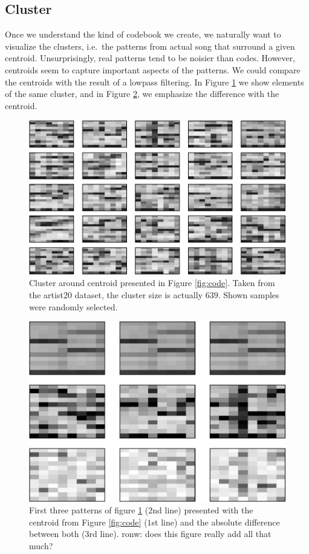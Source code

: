 \documentclass{article}
\newcommand{\ie}{i.e.~}
\begin{document}
\subsection{Cluster}
Once we understand the kind of codebook we create, we naturally want
to visualize the clusters, \ie the patterns from actual song that
surround a given centroid. Unsurprisingly, real patterns tend to be
noisier than codes. However, centroids seem to capture important aspects
of the patterns. We could compare the centroids with the result of
a lowpass filtering. In Figure \ref{fig:cluster} we show elements of the same
cluster, and in Figure \ref{fig:cluster_diff}, we emphasize the difference
with the centroid.

\begin{figure}[htb]
\begin{center}
\includegraphics[width=.9\columnwidth]{close_patterns1}
\end{center}
\caption{\small{Cluster around centroid presented in
Figure \ref{fig:code}. Taken from the artist20 dataset, the cluster
size is actually $639$. Shown samples were randomly selected.
}}
\label{fig:cluster}
\end{figure}

\begin{figure}[htb]
\begin{center}
\includegraphics[width=.8\columnwidth]{close_patterns_diff}
\end{center}
\caption{\small{First three patterns of figure \ref{fig:cluster}
($2$nd line) presented with the centroid from Figure \ref{fig:code}
($1$st line) and the absolute difference between both ($3$rd line).
}
ronw: does this figure really add all that much?
}
\label{fig:cluster_diff}
\end{figure}
\end{document}
